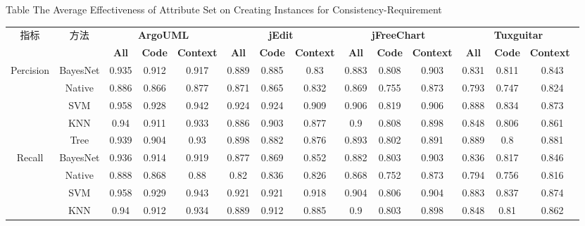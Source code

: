 \begin{sidewaystable} [htbp]
{Table$\!$}
{The Average Effectiveness of Attribute Set on Creating Instances for Consistency-Requirement}
\vspace{0.5em}
\centering
\wuhao
\begin{tabular}{cccccccccccccc}
\toprule[1.5pt]
\multirow{2}{*}{指标}&\multirow{2}{*}{方法}&\multicolumn{3}{c}{\textbf{ArgoUML}}&\multicolumn{3}{c}{\textbf{jEdit}}&\multicolumn{3}{c}{\textbf{jFreeChart}}&\multicolumn{3}{c}{\textbf{Tuxguitar}}\\
\cline{3-14}
&&\textbf{All}&\textbf{Code}&\textbf{Context}&\textbf{All}&\textbf{Code}&\textbf{Context}&\textbf{All}&\textbf{Code}&\textbf{Context}&\textbf{All}&\textbf{Code}&\textbf{Context}~\\
\midrule[1pt]
\multirow{5}{*}{Percision}
&BayesNet&	0.935&	0.912&	0.917&		0.889&	0.885&	0.83&		0.883&	0.808&	0.903&		0.831&	0.811&	0.843\\
&Native&	0.886&	0.866&	0.877&		0.871&	0.865&	0.832&		0.869&	0.755&	0.873&		0.793&	0.747&	0.824\\
&SVM&	0.958&	0.928&	0.942&		0.924&	0.924&	0.909&		0.906&	0.819&	0.906&		0.888&	0.834&	0.873\\
&KNN&	0.94&	0.911&	0.933&		0.886&	0.903&	0.877&		0.9	&0.808&	0.898&		0.848&	0.806&	0.861\\
&Tree&	0.939&	0.904&	0.93&		0.898&	0.882&	0.876&		0.893&	0.802&	0.891&		0.889&	0.8&	0.881\\
\hline
\multirow{5}{*}{Recall}
&BayesNet&	0.936&	0.914&	0.919&		0.877&	0.869&	0.852&		0.882&	0.803&	0.903&		0.836&	0.817&	0.846\\
&Native&	0.888&	0.868&	0.88&		0.82&	0.836&	0.826&		0.868&	0.752&	0.873&		0.794&	0.756&	0.816\\
&SVM&	0.958&	0.929&	0.943&		0.921&	0.921&	0.918&		0.904&	0.806&	0.904&		0.883&	0.837&	0.874\\
&KNN&	0.94&	0.912&	0.934&		0.889&	0.912&	0.885&		0.9&	0.803&	0.898&		0.848&	0.81&	0.862\\

\end{tabular}
\end{sidewaystable}
